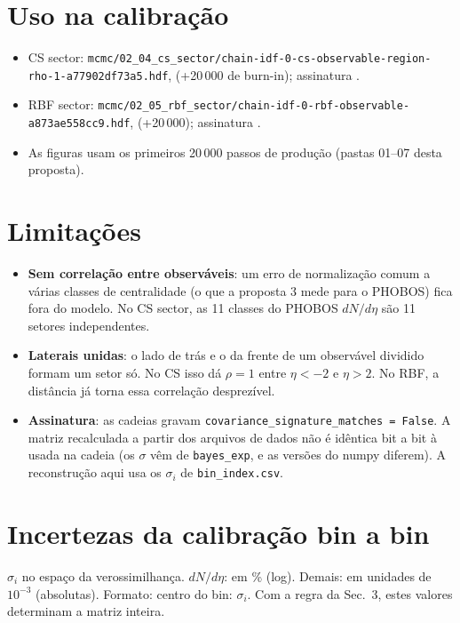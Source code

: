 \documentclass[11pt,a4paper]{article}
\newcommand{\arq}[1]{\texttt{\nolinkurl{#1}}}
\begin{document}
\section{Uso na calibração}
\begin{itemize}[nosep]
\item CS sector: \arq{mcmc/02_04_cs_sector/chain-idf-0-cs-observable-region-rho-1-a77902df73a5.hdf}, \valStepsCs{}
(+20\,000 de burn-in); assinatura \texttt{\valSigCs}.
\item RBF sector: \arq{mcmc/02_05_rbf_sector/chain-idf-0-rbf-observable-a873ae558cc9.hdf}, \valStepsRbf{} (+20\,000);
assinatura \texttt{\valSigRbf}.
\item As figuras usam os primeiros 20\,000 passos de produção (pastas 01--07 desta proposta).
\end{itemize}

\section{Limitações}
\begin{itemize}[nosep]
\item \textbf{Sem correlação entre observáveis}: um erro de normalização comum a várias classes de centralidade (o que
a proposta 3 mede para o PHOBOS) fica fora do modelo. No CS sector, as 11 classes do PHOBOS $dN/d\eta$ são 11 setores
independentes.
\item \textbf{Laterais unidas}: o lado de trás e o da frente de um observável dividido formam um setor só. No CS isso dá
$\rho=1$ entre $\eta<-2$ e $\eta>2$. No RBF, a distância já torna essa correlação desprezível.
\item \textbf{Assinatura}: as cadeias gravam \texttt{covariance\_signature\_matches = False}. A matriz recalculada a partir
dos arquivos de dados não é idêntica bit a bit à usada na cadeia (os $\sigma$ vêm de \texttt{bayes\_exp}, e as versões do
numpy diferem). A reconstrução aqui usa os $\sigma_i$ de \texttt{bin\_index.csv}.
\end{itemize}

\appendix
\section{Incertezas da calibração bin a bin}\label{ap:sigma}
$\sigma_i$ no espaço da verossimilhança. $dN/d\eta$: em \% (log). Demais: em unidades de $10^{-3}$ (absolutas). Formato:
centro do bin: $\sigma_i$. Com a regra da Sec.~3, estes valores determinam a matriz inteira.
\par\medskip
{\scriptsize{}}
\end{document}
